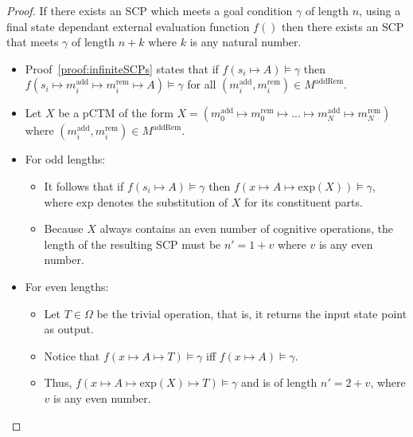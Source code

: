\begin{proof} \label{proof:infiniteSCPLength}
If there exists an SCP which meets a goal condition $\gamma$ of length $n$, using a final state dependant external evaluation function $f()$ then there exists an SCP that meets $\gamma$ of length $n+k$ where $k$ is any natural number.
\begin{itemize}

\item Proof~\ref{proof:infiniteSCPs} states that if $f(s_i \longmapsto A)\models \gamma$ then $f(s_i \longmapsto m^\text{add}_i \longmapsto m^\text{rem}_i \longmapsto A) \models \gamma$ for all $(m^\text{add}_i, m^\text{rem}_i) \in M^\text{addRem}$.
\item Let $X$ be a pCTM of the form $X=(m^\text{add}_0 \longmapsto m^\text{rem}_0 \longmapsto ... \longmapsto m^\text{add}_N \longmapsto m^\text{rem}_{N})$ where $(m^\text{add}_i, m^\text{rem}_i) \in M^\text{addRem}$.
\item For odd lengths:
\begin{itemize}
\item  It follows that if $f(s_i \longmapsto A)\models \gamma$ then $f(x \longmapsto A \longmapsto \textrm{exp}(X))\models \gamma$, where $\textrm{exp}$ denotes the substitution of $X$ for its constituent parts.
\item Because $X$ always contains an even number of cognitive operations, the length of the resulting SCP must be $n' = 1+v$ where $v$ is any even number.
\end{itemize}
\item For even lengths:
\begin{itemize}
\item Let $T \in \Omega$ be the trivial operation, that is, it returns the input state point as output.
\item Notice that $f(x \longmapsto A \longmapsto T) \models \gamma$ iff $f(x \longmapsto A) \models \gamma$.
\item Thus, $f(x \longmapsto A \longmapsto \textrm{exp}(X) \longmapsto T )\models \gamma$ and is of length $n' = 2+v$, where $v$ is any even number.
\end{itemize}
\end{itemize}

\end{proof}

